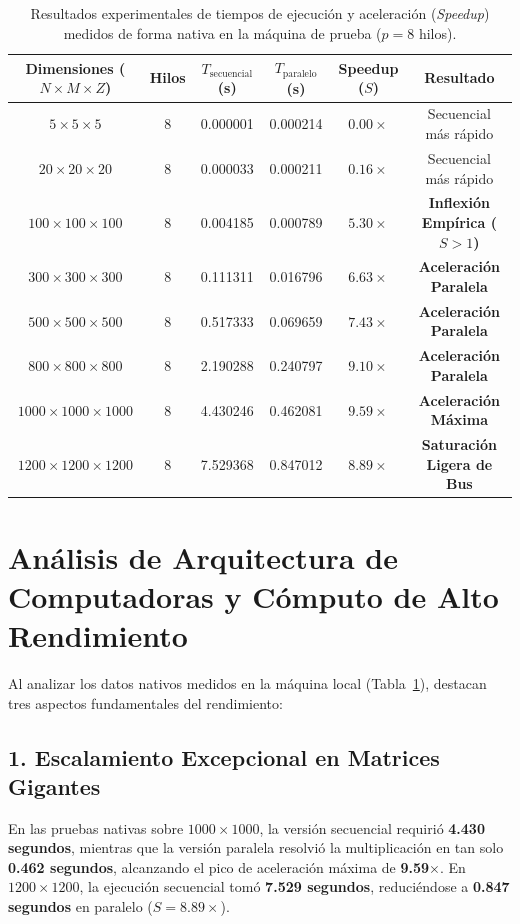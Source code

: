 \documentclass[runningheads]{llncs}
\begin{document}
\begin{table}[h!]
\centering
\caption{Resultados experimentales de tiempos de ejecución y aceleración (\textit{Speedup}) medidos de forma nativa en la máquina de prueba ($p = 8$ hilos).}
\label{tab:resultados_empiricos}
\begin{tabular}{cccccc}
\toprule
\textbf{Dimensiones ($N \times M \times Z$)} & \textbf{Hilos} & \textbf{$T_{\text{secuencial}}$ (s)} & \textbf{$T_{\text{paralelo}}$ (s)} & \textbf{Speedup ($S$)} & \textbf{Resultado} \\
\midrule
$5 \times 5 \times 5$ & 8 & 0.000001 & 0.000214 & $0.00\times$ & Secuencial más rápido \\
$20 \times 20 \times 20$ & 8 & 0.000033 & 0.000211 & $0.16\times$ & Secuencial más rápido \\
$100 \times 100 \times 100$ & 8 & 0.004185 & 0.000789 & $\mathbf{5.30\times}$ & \textbf{Inflexión Empírica ($S > 1$)} \\
$300 \times 300 \times 300$ & 8 & 0.111311 & 0.016796 & $\mathbf{6.63\times}$ & \textbf{Aceleración Paralela} \\
$500 \times 500 \times 500$ & 8 & 0.517333 & 0.069659 & $\mathbf{7.43\times}$ & \textbf{Aceleración Paralela} \\
$800 \times 800 \times 800$ & 8 & 2.190288 & 0.240797 & $\mathbf{9.10\times}$ & \textbf{Aceleración Paralela} \\
$1000 \times 1000 \times 1000$ & 8 & 4.430246 & 0.462081 & $\mathbf{9.59\times}$ & \textbf{Aceleración Máxima} \\
$1200 \times 1200 \times 1200$ & 8 & 7.529368 & 0.847012 & $\mathbf{8.89\times}$ & \textbf{Saturación Ligera de Bus} \\
\bottomrule
\end{tabular}
\end{table}

\section{Análisis de Arquitectura de Computadoras y Cómputo de Alto Rendimiento}

Al analizar los datos nativos medidos en la máquina local (Tabla~\ref{tab:resultados_empiricos}), destacan tres aspectos fundamentales del rendimiento:

\subsection{1. Escalamiento Excepcional en Matrices Gigantes}
En las pruebas nativas sobre $1000 \times 1000$, la versión secuencial requirió \textbf{4.430 segundos}, mientras que la versión paralela resolvió la multiplicación en tan solo \textbf{0.462 segundos}, alcanzando el pico de aceleración máxima de \textbf{9.59}$\times$. En $1200 \times 1200$, la ejecución secuencial tomó \textbf{7.529 segundos}, reduciéndose a \textbf{0.847 segundos} en paralelo ($S = 8.89\times$).
\end{document}
